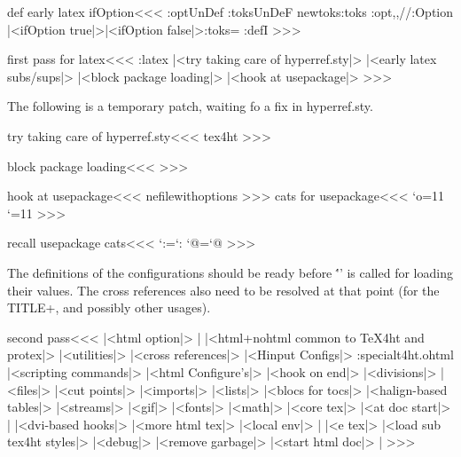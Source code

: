 \<def early latex ifOption\><<<
\ifx \config:opt\:UnDef \else
   \ifx\tmp:toks\:UnDeF    \csname newtoks\endcsname\tmp:toks\fi
   \def\:temp{\def\ifOption##1}
   \expandafter\expandafter\expandafter{}
        \expandafter{\config:opt,,//\if:Option
   |<ifOption true|>\else |<ifOption false|>\fi  \tmp:toks=}
   \pend:defI\ifOption{\def\:temp{##1}\:Optionfalse\:ScanOptions}
\fi
>>>



\<first pass for latex\><<<
\if:latex 
   |<try taking care of hyperref.sty|>
   |<early latex subs/sups|> 
\fi
|<block package loading|>
|<hook at usepackage|>
>>>

The following is a temporary patch, waiting fo a fix in hyperref.sty.


\<try taking care of hyperref.sty\><<<
\expandafter\def\csname opt@hyperref.sty\endcsname{tex4ht}
>>>

\<block package loading\><<<
\def\:dontusepackage#1{%
  \typeout{tex4ht warning: package #1 was prevented from loading}
  \@namedef{ver@#1.sty}{9999/12/31}%
  \@namedef{opt@#1.sty}{\:currentoptions}
}
>>>

\<hook at usepackage\><<<
\let\:onefilewithoptions\@onefilewithoptions
\def\@onefilewithoptions#1[#2]{%
   \let\:temp\@reset@ptions
   \def\@reset@ptions{%
      \let\@reset@ptions\:temp
      |<cats for usepackage|>\a:usepackage
      |<recall usepackage cats|>}%
      \def\:currentoptions{#2}
 \:onefilewithoptions#1[#2]}
\def\a:usepackage{ }
>>>
\<cats for usepackage\><<<
\edef\TivhTcats{%
   \catcode`:=\the\catcode`:%
   \catcode`@=\the\catcode`@}%
\catcode`\:=11 \catcode`\@=11
>>>

\<recall usepackage cats\><<<
\TivhTcats
>>>



The definitions of the configurations should be ready before
\''\Hinput' is called for loading their values.  The cross references
also need to be resolved at that point (for the TITLE+, and possibly
other usages).

\<second pass\><<<
|<html option|>                  |%
|<html+nohtml common to TeX4ht and protex|>
|<utilities|>
|<cross references|>
\ifHtml
   |<Hinput Configs|>
     \ht:special{t4ht.\:html} 
   |<scripting commands|>
   |<html Configure's|>   
   |<hook on end|>
\fi
|<divisions|>
|<files|>
|<cut points|>
|<imports|>
|<lists|>
|<blocs for tocs|>
\ifHtml
   |<halign-based tables|>
\fi
|<streams|>
|<gif|> 
|<fonts|>
|<math|>
|<core tex|>
|<at doc start|>  |%
\ifHtml
   |<dvi-based hooks|>
   |<more html tex|> 
\fi
|<local env|>                    |%
\ifx\beginL\@undefined \else
   \ifHtml 
      |<e tex|>
\fi\fi
|<load sub tex4ht styles|>
|<debug|>
|<remove garbage|>
\ifHtml |<start html doc|> \fi   |%
>>>



